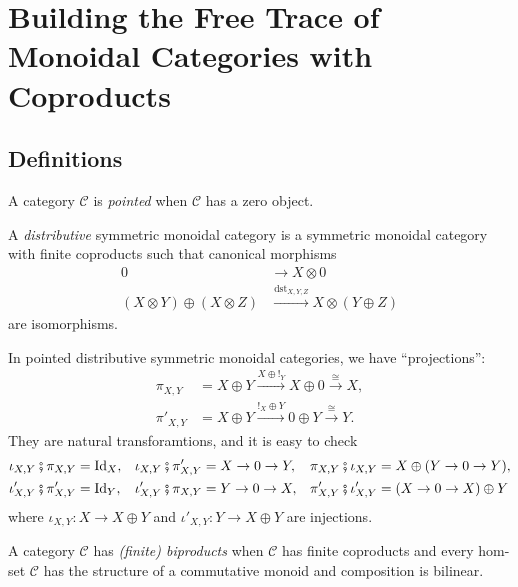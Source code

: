 
\section{Building the Free Trace of Monoidal Categories with Coproducts}
\subsection{Definitions}

\begin{definition}
  A category $\mathcal{C}$ is \emph{pointed} when $\mathcal{C}$
  has a zero object.
\end{definition}

\begin{definition}
  A \emph{distributive} symmetric monoidal category is a symmetric monoidal
  category with finite coproducts such that canonical morphisms
  \begin{align*}
    0 &\longrightarrow X \otimes 0 \\
    (X \otimes Y) \oplus (X \otimes Z) &\xrightarrow{\mathrm{dst}_{X,Y,Z}} X \otimes (Y \oplus Z)
  \end{align*}
  are isomorphisms.
\end{definition}

In pointed distributive symmetric monoidal categories, we have ``projections'':
\begin{align*}
  \pi_{X,Y} &= X \oplus Y \xrightarrow{X \oplus !_{Y}} X \oplus 0 \xrightarrow{\cong} X, \\
  \pi'_{X,Y} &= X \oplus Y \xrightarrow{!_{X} \oplus Y} 0 \oplus Y \xrightarrow{\cong} Y.
\end{align*}
They are natural transforamtions, and it is easy to check
\begin{align*}
  \iota_{X,Y} \fatsemi \pi_{X,Y} &= \mbox{Id}_{X}, &
  \iota_{X,Y} \fatsemi \pi'_{X,Y} &= X \to 0 \to Y, &
  \pi_{X,Y} \fatsemi \iota_{X,Y} &= X \oplus (Y \to 0 \to Y), \\
  \iota'_{X,Y} \fatsemi \pi'_{X,Y} &= \mbox{Id}_{Y}, &
  \iota'_{X,Y} \fatsemi \pi_{X,Y} &= Y \to 0 \to X, &
  \pi'_{X,Y} \fatsemi \iota'_{X,Y} &= (X \to 0 \to X) \oplus Y
\end{align*}
where $\iota_{X,Y} \colon X \to X \oplus Y$ and
$\iota'_{X,Y} \colon Y \to X \oplus Y$ are injections. 

\begin{definition}
  A category $\mathcal{C}$ has \emph{(finite) biproducts} when
  $\mathcal{C}$ has finite coproducts and every hom-set
  $\mathcal{C}$ has the structure of a commutative monoid and
  composition is bilinear.
\end{definition}

